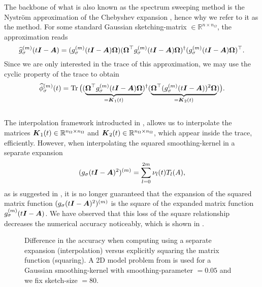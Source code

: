 The backbone of what is also known as the spectrum sweeping method \cite{lin2017randomized}
is the Nystr\"om approximation of the Chebyshev expansion ,
hence why we refer to it as the  method. 
For some standard Gaussian \gls{sketching-matrix} $\in \mathbb{R}^{n \times n_{\Omega}}$,
the approximation reads
\begin{equation}
    \widehat{g}_{\sigma}^{(m)}(t\boldsymbol{I} - \boldsymbol{A})
    = (g_{\sigma}^{(m)}(t\boldsymbol{I} - \boldsymbol{A}) \boldsymbol{\Omega}) (\boldsymbol{\Omega}^{\top} g_{\sigma}^{(m)}(t\boldsymbol{I} - \boldsymbol{A}) \boldsymbol{\Omega})^{\dagger} (g_{\sigma}^{(m)}(t\boldsymbol{I} - \boldsymbol{A}) \boldsymbol{\Omega})^{\top}.
    \label{equ:3-nystrom-nystrom-smoothing-kernel}
\end{equation}
Since we are only interested in the trace of this approximation,
we may use the cyclic property of the trace to obtain
\begin{equation}
    \widehat{\phi}_{\sigma}^{(m)}(t)
        = \operatorname{Tr}\big((\underbrace{\boldsymbol{\Omega}^{\top} g_{\sigma}^{(m)}(t\boldsymbol{I} - \boldsymbol{A}) \boldsymbol{\Omega}}_{=\boldsymbol{K}_1(t)})^{\dagger} (\underbrace{\boldsymbol{\Omega}^{\top} (g_{\sigma}^{(m)}(t\boldsymbol{I} - \boldsymbol{A}))^2 \boldsymbol{\Omega}}_{=\boldsymbol{K}_2(t)})\big).
    \label{equ:3-nystrom-spectral-density}
\end{equation}\\

The interpolation framework introducted in ,
allows us to interpolate the matrices $\boldsymbol{K}_1(t) \in \mathbb{R}^{n_{\Omega} \times n_{\Omega}}$
and $\boldsymbol{K}_2(t) \in \mathbb{R}^{n_{\Omega} \times n_{\Omega}}$,
which appear inside the trace, efficiently.
However, when interpolating the
squared \gls{smoothing-kernel} in a separate expansion
\begin{equation}
    (g_{\sigma}(t\boldsymbol{I} - \boldsymbol{A})^2)^{(m)} = \sum_{l=0}^{2m} \nu_l(t) T_l(A),
    \label{equ:3-nystrom-ESS-chebyshev-expansion}
\end{equation}
as is suggested in \cite{lin2017randomized}, it is no longer guaranteed that
the expansion of the squared matrix function $(g_{\sigma}(t\boldsymbol{I} - \boldsymbol{A})^2)^{(m)}$
is the square of the expanded matrix function $g_{\sigma}^{(m)}(t\boldsymbol{I} - \boldsymbol{A})$.
We have observed that this loss of the square relationship
decreases the numerical accuracy noticeably, which is
shown in .\\
\begin{figure}[ht]
    \centering
    
    \caption{Difference in the accuracy when computing 
        using a separate expansion (interpolation) versus explicitly squaring
        the matrix function (squaring). A 2D model problem from 
        is used for a Gaussian \gls{smoothing-kernel} with \gls{smoothing-parameter} $=0.05$
        and we fix \gls{sketch-size} $=80$.}
    \label{fig:3-nystrom-interpolation-issue}
\end{figure}

